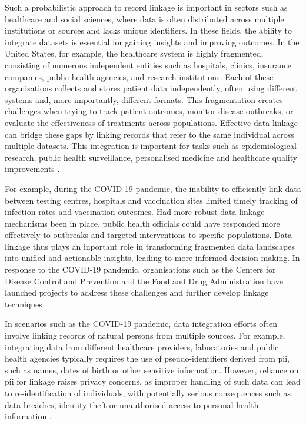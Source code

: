 Such a probabilistic approach to record linkage is important in sectors such as healthcare and social sciences, where data is often distributed across multiple institutions or sources and lacks unique identifiers.
In these fields, the ability to integrate datasets is essential for gaining insights and improving outcomes.
In the United States, for example, the healthcare system is highly fragmented, consisting of numerous independent entities such as hospitals, clinics, insurance companies, public health agencies, and research institutions.
Each of these organisations collects and stores patient data independently, often using different systems and, more importantly, different formats.
This fragmentation creates challenges when trying to track patient outcomes, monitor disease outbreaks, or evaluate the effectiveness of treatments across populations.
Effective data linkage can bridge these gaps by linking records that refer to the same individual across multiple datasets.
This integration is important for tasks such as epidemiological research, public health surveillance, personalised medicine and healthcare quality improvements \cite{pathak2024privacy, vatsalan2017privacy}.

For example, during the COVID-19 pandemic, the inability to efficiently link data between testing centres, hospitals and vaccination sites limited timely tracking of infection rates and vaccination outcomes.
Had more robust data linkage mechanisms been in place, public health officials could have responded more effectively to outbreaks and targeted interventions to specific populations.
Data linkage thus plays an inportant role in transforming fragmented data landscapes into unified and actionable insights, leading to more informed decision-making.
In response to the COVID-19 pandemic, organisations such as the Centers for Disease Control and Prevention and the Food and Drug Administration have launched projects to address these challenges and further develop linkage techniques \cite{pathak2024privacy}.

In scenarios such as the COVID-19 pandemic, data integration efforts often involve linking records of natural persons from multiple sources.
For example, integrating data from different healthcare providers, laboratories and public health agencies typically requires the use of pseudo-identifiers derived from \ac{pii}, such as names, dates of birth or other sensitive information.
However, reliance on \ac{pii} for linkage raises privacy concerns, as improper handling of such data can lead to re-identification of individuals, with potentially serious consequences such as data breaches, identity theft or unauthorised access to personal health information \cite{pathak2024privacy, schnell2009privacy}.

